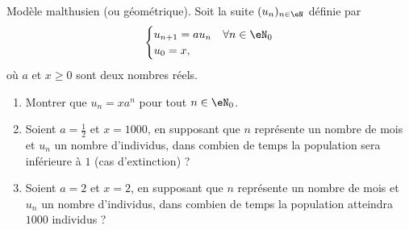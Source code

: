 


\begin{exercice}\label{exoTD3-0002}

	Modèle malthusien (ou géométrique). Soit la suite $(u_n)_{n\in\eN}$ définie par
	\begin{equation}
		\begin{cases}
			u_{n+1}=au_n	&	\text{}\forall n\in\eN_0\\
			u_0=x,
		\end{cases}
	\end{equation}
	où $a$ et $x\geq 0$ sont deux nombres réels.

	\begin{enumerate}
		\item
			Montrer que $u_n=xa^n$ pour tout $n\in\eN_0$.
		\item
			Soient $a=\frac{ 1 }{2}$ et $x=1000$, en supposant que $n$ représente un nombre de mois et $u_n$ un nombre d'individus, dans combien de temps la population sera inférieure à $1$ (cas d'extinction) ?
		\item
			Soient $a=2$ et $x=2$, en supposant que $n$ représente un nombre de mois et $u_n$ un nombre d'individus, dans combien de temps la population atteindra $1000$ individus ?

	\end{enumerate}

\end{exercice}
